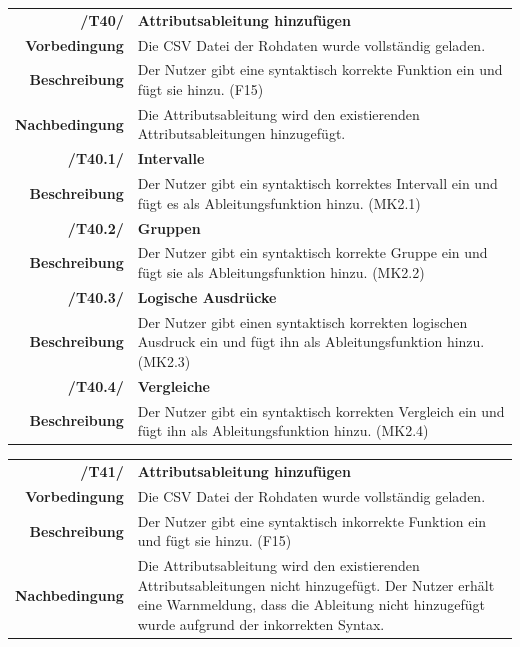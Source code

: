 \documentclass{article}
\begin{document}
\begin{table}[H]
\begin{tabularx}{\textwidth}{rX}
\textbf{/T40/}         & \textbf{Attributsableitung hinzufügen} \\
\textbf{Vorbedingung}  & Die CSV Datei der Rohdaten wurde vollständig geladen.   \\
\textbf{Beschreibung}  & Der Nutzer gibt eine syntaktisch korrekte Funktion ein und fügt sie hinzu. (F15) \\
\textbf{Nachbedingung} & Die Attributsableitung wird den existierenden Attributsableitungen hinzugefügt.\\

\textbf{/T40.1/}         & \textbf{Intervalle} \\
\textbf{Beschreibung}  & Der Nutzer gibt ein syntaktisch korrektes Intervall ein und fügt es als Ableitungsfunktion hinzu. (MK2.1) \\

\textbf{/T40.2/}         & \textbf{Gruppen} \\
\textbf{Beschreibung}  & Der Nutzer gibt ein syntaktisch korrekte Gruppe ein und fügt sie als Ableitungsfunktion hinzu. (MK2.2) \\

\textbf{/T40.3/}         & \textbf{Logische Ausdrücke} \\
\textbf{Beschreibung}  & Der Nutzer gibt einen syntaktisch korrekten logischen Ausdruck ein und fügt ihn als Ableitungsfunktion hinzu. (MK2.3) \\

\textbf{/T40.4/}         & \textbf{Vergleiche} \\
\textbf{Beschreibung}  & Der Nutzer gibt ein syntaktisch korrekten Vergleich ein und fügt ihn als Ableitungsfunktion hinzu. (MK2.4) \\
\end{tabularx}
\end{table}

\begin{table}[H]
\begin{tabularx}{\textwidth}{rX}
\textbf{/T41/}         & \textbf{Attributsableitung hinzufügen} \\
\textbf{Vorbedingung}  & Die CSV Datei der Rohdaten wurde vollständig geladen.   \\
\textbf{Beschreibung}  & Der Nutzer gibt eine syntaktisch inkorrekte Funktion ein und fügt sie hinzu. (F15) \\
\textbf{Nachbedingung} & Die Attributsableitung wird den existierenden Attributsableitungen nicht hinzugefügt. Der Nutzer erhält eine Warnmeldung, dass die Ableitung nicht hinzugefügt wurde aufgrund der inkorrekten Syntax.
\end{tabularx}
\end{table}
\end{document}
